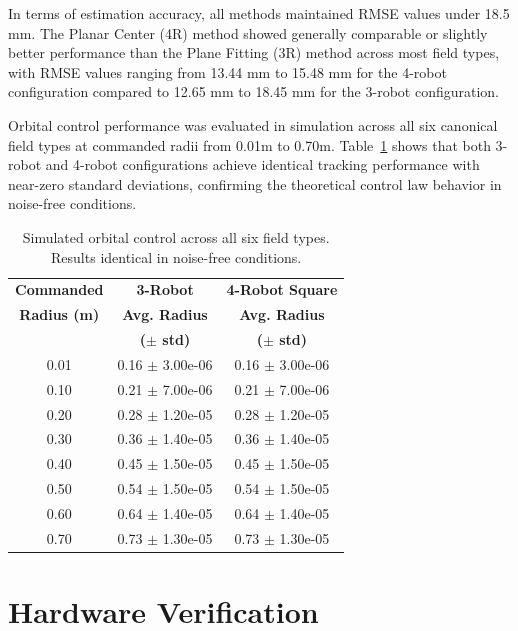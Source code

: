 \documentclass[lettersize,journal]{IEEEtran}
\begin{document}
In terms of estimation accuracy, all methods maintained RMSE values under 18.5 mm. The Planar Center (4R) method showed generally comparable or slightly better performance than the Plane Fitting (3R) method across most field types, with RMSE values ranging from 13.44 mm to 15.48 mm for the 4-robot configuration compared to 12.65 mm to 18.45 mm for the 3-robot configuration.

Orbital control performance was evaluated in simulation across all six canonical field types at commanded radii from 0.01m to 0.70m. Table~\ref{tab:simulation_orbital_results} shows that both 3-robot and 4-robot configurations achieve identical tracking performance with near-zero standard deviations, confirming the theoretical control law behavior in noise-free conditions.

\begin{table}[h]
    \centering
    \begin{tabular}{ccc}
    \hline
    \textbf{Commanded} & \textbf{3-Robot} & \textbf{4-Robot Square} \\
    \textbf{Radius (m)} & \textbf{Avg. Radius} & \textbf{Avg. Radius} \\
     & \textbf{($\pm$ std)} & \textbf{($\pm$ std)} \\
    \hline
    0.01 & 0.16 $\pm$ 3.00e-06 & 0.16 $\pm$ 3.00e-06 \\
    0.10 & 0.21 $\pm$ 7.00e-06 & 0.21 $\pm$ 7.00e-06 \\
    0.20 & 0.28 $\pm$ 1.20e-05 & 0.28 $\pm$ 1.20e-05 \\
    0.30 & 0.36 $\pm$ 1.40e-05 & 0.36 $\pm$ 1.40e-05 \\
    0.40 & 0.45 $\pm$ 1.50e-05 & 0.45 $\pm$ 1.50e-05 \\
    0.50 & 0.54 $\pm$ 1.50e-05 & 0.54 $\pm$ 1.50e-05 \\
    0.60 & 0.64 $\pm$ 1.40e-05 & 0.64 $\pm$ 1.40e-05 \\
    0.70 & 0.73 $\pm$ 1.30e-05 & 0.73 $\pm$ 1.30e-05 \\
    \hline
    \end{tabular}
    \caption{Simulated orbital control across all six field types. Results identical in noise-free conditions.}
    \label{tab:simulation_orbital_results}
    \end{table}


\section{Hardware Verification}
\end{document}
